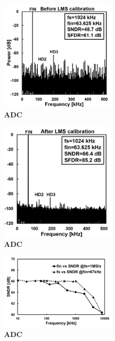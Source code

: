 \documentclass[letterpaper, 10 pt, conference]{ieeeconf}  %
\begin{document}
\begin{figure}[ht!]
\centering
 \includegraphics[width=0.5\textwidth]{figs/beforecal.png}
  \captionsetup{font=footnotesize}
  \caption{\textbf{ADC}}
  \label{highlight}
\end{figure}

\begin{figure}[ht!]
\centering
 \includegraphics[width=0.5\textwidth]{figs/aftercal.png}
  \captionsetup{font=footnotesize}
  \caption{\textbf{ADC}}
  \label{highlight}
\end{figure}

\begin{figure}[ht!]
\centering
 \includegraphics[width=0.5\textwidth]{figs/freq-sndr.png}
  \captionsetup{font=footnotesize}
  \caption{\textbf{ADC}}
  \label{highlight}
\end{figure}
\end{document}
